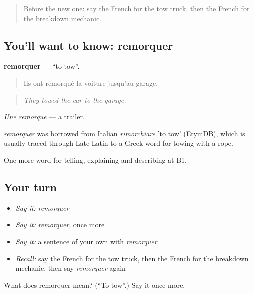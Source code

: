 \label{lesson:FR-C405-remorquer}



\begin{quote}
Before the new one: say the French for the tow truck, then the French for the breakdown mechanic.
\end{quote}

\subsection*{You'll want to know: remorquer}
\textbf{remorquer} — \textquotedblleft{}to tow\textquotedblright{}.

\begin{quote}
Ils ont remorqué la voiture jusqu'au garage.
\end{quote}

\begin{quote}
\emph{They towed the car to the garage.}
\end{quote}

\emph{Une remorque} — a trailer.

\begin{cousinweb}
\emph{remorquer} was borrowed from Italian \emph{rimorchiare} 'to tow' (EtymDB), which is usually traced through Late Latin to a Greek word for towing with a rope.
\end{cousinweb}

\begin{grammarlens}[title={What you've built}]
One more word for telling, explaining and describing at B1.
\end{grammarlens}

\subsection*{Your turn}
\begin{itemize}
\raggedright
  \item \emph{Say it:} \emph{remorquer}
  \item \emph{Say it:} \emph{remorquer}, once more
  \item \emph{Say it:} a sentence of your own with \emph{remorquer}
  \item \emph{Recall:} say the French for the tow truck, then the French for the breakdown mechanic, then say \emph{remorquer} again
\end{itemize}

\begin{tcolorbox}[breakable,colback=teal!4,colframe=teal!35!black,title={Before you move on}]
What does remorquer mean? (\textquotedblleft{}To tow\textquotedblright{}.) Say it once more.
\end{tcolorbox}
